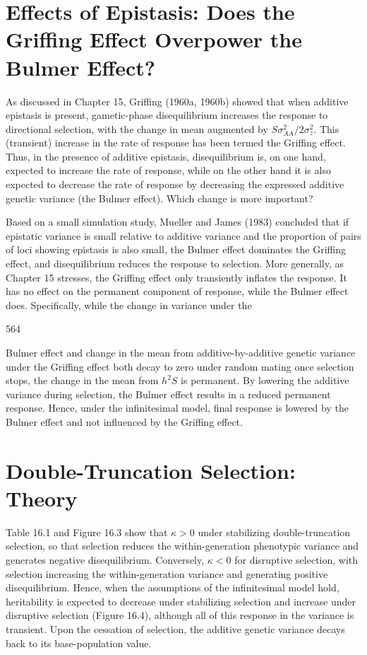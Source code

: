\documentclass{article}
\begin{document}
\section{Effects of Epistasis: Does the Griffing Effect Overpower the Bulmer Effect?}
As discussed in Chapter 15, Griffing (1960a, 1960b) showed that when additive epistasis is present, gametic-phase disequilibrium increases the response to directional selection, with the change in mean augmented by  $ S\sigma_{AA}^{2}/2\sigma_{z}^{2} $. This (transient) increase in the rate of response has been termed the Griffing effect. Thus, in the presence of additive epistasis, disequilibrium is, on one hand, expected to increase the rate of response, while on the other hand it is also expected to decrease the rate of response by decreasing the expressed additive genetic variance (the Bulmer effect). Which change is more important?

Based on a small simulation study, Mueller and James (1983) concluded that if epistatic variance is small relative to additive variance and the proportion of pairs of loci showing epistasis is also small, the Bulmer effect dominates the Griffing effect, and disequilibrium reduces the response to selection. More generally, as Chapter 15 stresses, the Griffing effect only transiently inflates the response. It has no effect on the permanent component of response, while the Bulmer effect does. Specifically, while the change in variance under the

564

Bulmer effect and change in the mean from additive-by-additive genetic variance under the Griffing effect both decay to zero under random mating once selection stops, the change in the mean from  $ h^{2}S $ is permanent. By lowering the additive variance during selection, the Bulmer effect results in a reduced permanent response. Hence, under the infinitesimal model, final response is lowered by the Bulmer effect and not influenced by the Griffing effect.

\section{Double-Truncation Selection: Theory}
Table 16.1 and Figure 16.3 show that  $ \kappa > 0 $ under stabilizing double-truncation selection, so that selection reduces the within-generation phenotypic variance and generates negative disequilibrium. Conversely,  $ \kappa < 0 $ for disruptive selection, with selection increasing the within-generation variance and generating positive disequilibrium. Hence, when the assumptions of the infinitesimal model hold, heritability is expected to decrease under stabilizing selection and increase under disruptive selection (Figure 16.4), although all of this response in the variance is transient. Upon the cessation of selection, the additive genetic variance decays back to its base-population value.
\end{document}
